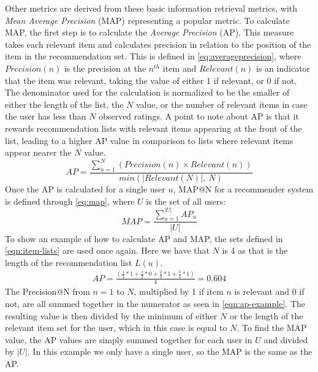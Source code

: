 Other metrics are derived from these basic information retrieval metrics, with \textit{Mean Average Precision} (MAP) representing a popular metric\cite{ChoosingMetricsEvaluation}.
To calculate MAP, the first step is to calculate the \textit{Average Precision} (AP).
This measure takes each relevant item and calculates precision in relation to the position of the item in the recommendation set.
This is defined in \autoref{eq:averageprecision}, where $Precision(n)$ is the precision at the $n^{th}$ item and $Relevant(n)$ is an indicator that the item was relevant, taking the value of either 1 if relevant, or 0 if not.
The denominator used for the calculation is normalized to be the smaller of either the length of the list, the $N$ value, or the number of relevant items in case the user has less than $N$ observed ratings.
A point to note about AP is that it rewards recommendation lists with relevant items appearing at the front of the list, leading to a higher AP value in comparison to lists where relevant items appear nearer the $N$ value. 
\begin{equation}
    \label{eq:averageprecision}
    AP = \frac{\sum\limits_{n=1}^N (Precision(n) \times Relevant(n))}{min(|Relevant(N)|,\:N)}
\end{equation}
Once the AP is calculated for a single user $u$, MAP@N for a recommender system is defined through \autoref{eq:map}, where $U$ is the set of all users: 
\begin{equation}
    \label{eq:map}
    MAP = \frac{\sum\limits_{u=1}^{|U|} AP_u}{|U|}
\end{equation}
To show an example of how to calculate AP and MAP, the sets defined in \autoref{eqn:item-lists} are used once again.
Here we have that $N$ is 4 as that is the length of the recommendation list $L(u)$.
\begin{align}
    AP = \frac{(\frac{1}{1}*1+\frac{1}{2}*0+\frac{2}{3}*1+\frac{3}{4}*1)}{4} = 0.604 \label{eqn:ap-example}
\end{align}
The Precision@N from $n=1$ to $N$, multiplied by 1 if item $n$ is relevant and 0 if not, are all summed together in the numerator as seen in \autoref{eqn:ap-example}.
The resulting value is then divided by the minimum of either $N$ or the length of the relevant item set for the user, which in this case is equal to $N$.
To find the MAP value, the AP values are simply summed together for each user in $U$ and divided by $|U|$.
In this example we only have a single user, so the MAP is the same as the AP.
\\\\
